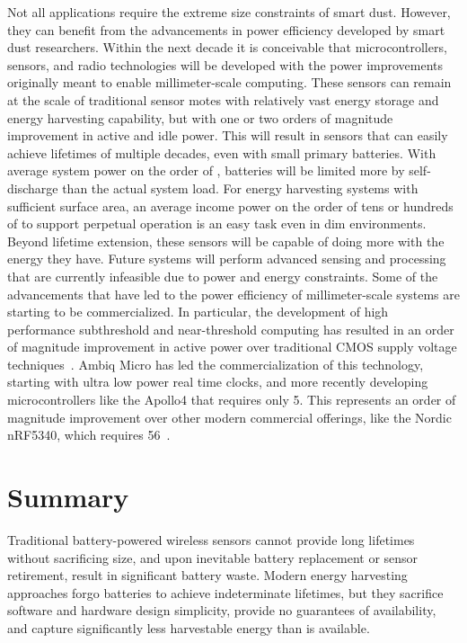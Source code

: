 Not all applications require the extreme size constraints of smart dust. However, they can benefit from the advancements in power efficiency developed by smart dust researchers.
Within the next decade it is conceivable that microcontrollers, sensors, and radio technologies will be developed with the power improvements originally meant to enable millimeter-scale computing.
These sensors can remain at the scale of traditional sensor motes with relatively vast energy storage and energy harvesting capability, but with one or two orders of magnitude improvement in active and idle power.
This will result in sensors that can easily achieve lifetimes of multiple decades, even with small primary batteries.
With average system power on the order of \ssi{\nano\watt}, batteries will be limited more by self-discharge than the actual system load.
For energy harvesting systems with sufficient surface area, an average income power on the order of tens or hundreds of \ssi{\nano\watt} to support perpetual operation is an easy task even in dim environments.
Beyond lifetime extension, these sensors will be capable of doing more with the energy they have. Future systems will perform advanced sensing and processing that are currently infeasible due to power and energy constraints.
Some of the advancements that have led to the power efficiency of millimeter-scale systems are starting to be commercialized.
In particular, the development of high performance subthreshold and near-threshold computing has resulted in an order of magnitude improvement in active power over traditional CMOS supply voltage techniques~\cite{zhai2009energy, dreslinski2010near}.
Ambiq Micro has led the commercialization of this technology, starting with ultra low power real time clocks, and more recently developing microcontrollers like the Apollo4 that requires only 5\ssi[per-mode=symbol]{\micro\ampere\per\mega\hertz}.
This represents an order of magnitude improvement over other modern commercial offerings, like the Nordic nRF5340, which requires 56\ssi[per-mode=symbol]{\micro\ampere\per\mega\hertz}~\cite{nrf5340}.

\section{Summary}
Traditional battery-powered wireless sensors cannot provide long lifetimes without sacrificing size, and upon inevitable battery replacement or sensor retirement, result in significant battery waste.
Modern energy harvesting approaches forgo batteries to achieve indeterminate lifetimes, but they sacrifice software and hardware design simplicity, provide no guarantees of availability, and capture significantly less harvestable energy than is available.

